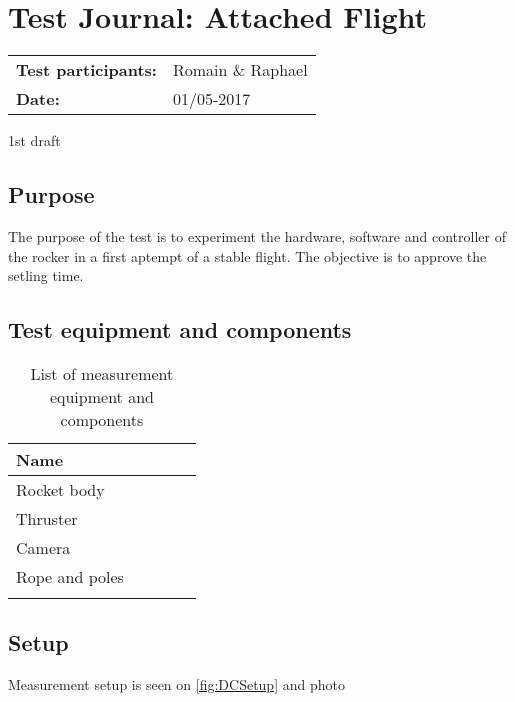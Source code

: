 \graphicspath{{figures/design/}}


			\chapter{Test Journal: Attached Flight}



\begin{table}[!h]
\begin{tabular}{l l}
\textbf{Test participants:} & Romain \& Raphael   \\
\textbf{Date:}  & 01/05-2017
\end{tabular}
\end{table}


			1st draft

	\section*{Purpose}
	
The purpose of the test is to experiment the hardware, software and controller of the rocker in a first aptempt of a stable flight. The objective is to approve the setling time.




	\section*{Test equipment and components}
	
\begin{table}[h]
	\centering
	\caption{List of measurement equipment and components}\label{tab_appendix:template}

	\begin{tabularx}{\textwidth}{lXXXX}
		Name 	\\ \toprule
		\rowcolor{lightGrey}
		Rocket body		\\
		Thruster	\\ 
		Camera 	\\
		Rope and poles \\ \rowcolor{lightGrey}
	\end{tabularx}
\end{table}




	\section*{Setup}
	
Measurement setup is seen on \autoref{fig:DCSetup} and photo \


